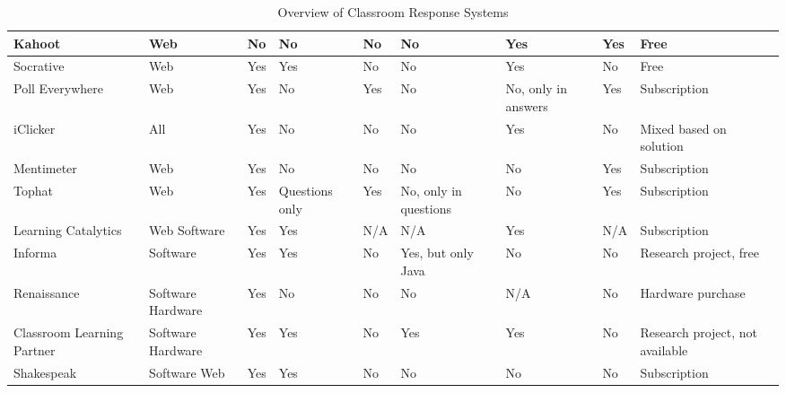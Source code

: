 \begin{landscape}
\begin{center}
\begin{table}[H]
\begin{tabularx}{\paperwidth}{ |X|X|X|X|X|X|X|X|X| }
              Kahoot                & Web   & No    & No    & \cellcolor{red!25}No    & \cellcolor{red!25}No    & Yes   & Yes   & Free \\ \hline
              Socrative             & Web   & Yes   & Yes   & \cellcolor{red!25}No    & \cellcolor{red!25}No    & Yes   & No    & Free \\ \hline
              Poll Everywhere       & Web   & Yes   & No    & \cellcolor{green!25}Yes   & \cellcolor{red!25}No    & No, only in answers   & Yes   & Subscription \\ \hline
              iClicker              & All   & Yes   & No    & \cellcolor{red!25}No    & \cellcolor{red!25}No    & Yes   & No    & Mixed based on solution \\ \hline
              Mentimeter            & Web   & Yes & No   & \cellcolor{red!25}No    & \cellcolor{red!25}No    & No    & Yes   & Subscription \\ \hline
              Tophat                & Web   & Yes & Questions only & \cellcolor{green!25}Yes & \cellcolor{red!25}No, only in questions   & No    & Yes & Subscription \\ \hline
              Learning Catalytics   & Web \newline Software   & Yes    & Yes  & N/A   & N/A   & Yes   & N/A   & Subscription \\ \hline
              Informa        & Software & Yes & Yes  & \cellcolor{red!25}No & \cellcolor{green!25}Yes, but only Java   & No    & No    & Research project, free \\ \hline
              Renaissance           & Software \newline Hardware & Yes & No & \cellcolor{red!25} No & \cellcolor{red!25}No & N/A & No & Hardware purchase \\ \hline
              Classroom Learning Partner & Software \newline Hardware & Yes & Yes & \cellcolor{red!25}No & \cellcolor{green!25}Yes & Yes & No & Research project, not available \\ \hline
              Shakespeak            & Software \newline Web & Yes & Yes & \cellcolor{red!25}No & \cellcolor{red!25}No & No & No & Subscription \\
              \hline
            \end{tabularx}
            \caption{Overview of Classroom Response Systems}\label{tab:overview}
        \end{table}
    \end{center}
\end{landscape}






